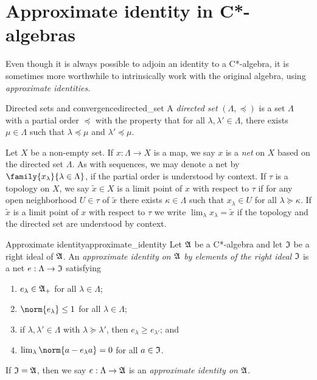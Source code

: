 \section{Approximate identity in C*-algebras}
Even though it is always possible to adjoin an identity to a C*-algebra, it is sometimes more worthwhile to intrinsically work with the original algebra, using \emph{approximate identities.}

\begin{definition}{Directed sets and convergence}{directed_set}
    A \emph{directed set} \((\Lambda, \preceq)\) is a set \(\Lambda\) with a partial order \(\preceq\) with the property that for all \(\lambda, \lambda' \in \Lambda\), there exists \(\mu \in \Lambda\) such that \(\lambda \preceq \mu\) and \(\lambda' \preceq \mu\).

    Let \(X\) be a non-empty set. If \(x : \Lambda \to X\) is a map, we say \(x\) is a \emph{net} on \(X\) based on the directed set \(\Lambda\). As with sequences, we may denote a net by \(\family{x_{\lambda}}{\lambda \in \Lambda}\), if the partial order is understood by context. If \(\tau\) is a topology on \(X\), we say \(\tilde{x} \in X\) is a limit point of \(x\) with respect to \(\tau\) if for any open neighborhood \(U \in \tau\) of \(\tilde{x}\) there exists \(\kappa\in \Lambda\) such that \(x_{\lambda} \in U\) for all \(\lambda \succeq \kappa\). If \(\tilde{x}\) is a limit point of \(x\) with respect to \(\tau\) we write \(\lim_{\lambda} x_{\lambda} = \tilde{x}\) if the topology and the directed set are understood by context.
\end{definition}

\begin{definition}{Approximate identity}{approximate_identity}
    Let \(\mathfrak{A}\) be a C*-algebra and let \(\mathfrak{I}\) be a right ideal of \(\mathfrak{A}\). An \emph{approximate identity on \(\mathfrak{A}\) by elements of the right ideal \(\mathfrak{I}\)} is a net \(e : \Lambda \to \mathfrak{I}\) satisfying
    \begin{enumerate}[label=(\alph*)]
        \item \(e_{\lambda} \in \mathfrak{A}_+\) for all \(\lambda \in \Lambda\);
        \item \(\norm{e_{\lambda}}\leq 1\) for all \(\lambda \in \Lambda\);
        \item if \(\lambda, \lambda' \in \Lambda\) with \(\lambda \succeq \lambda'\), then \(e_{\lambda} \geq e_{\lambda'}\); and
        \item \(\lim_{\lambda}{\norm{a - e_{\lambda}a}}= 0\) for all \(a \in \mathfrak{I}\).
    \end{enumerate}
    If \(\mathfrak{I} = \mathfrak{A}\), then we say \(e : \Lambda \to \mathfrak{A}\) is an \emph{approximate identity on \(\mathfrak{A}\)}.
\end{definition}

